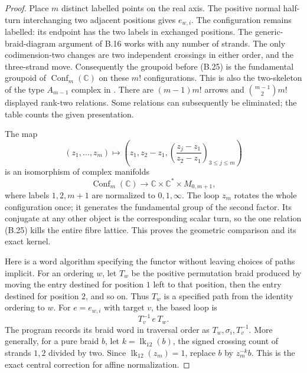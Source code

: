 \begin{proof}
Place $m$ distinct labelled points on the real axis.  The positive
normal half-turn interchanging two adjacent positions gives
$e_{w,i}$.  The configuration remains labelled: its endpoint has
the two labels in exchanged positions.  The generic-braid-diagram
argument of B.16 works with any number of strands.  The only
codimension-two changes are two independent crossings in either
order, and the three-strand move.  Consequently the groupoid
before (B.25) is the fundamental groupoid of
$\operatorname{Conf}_m(\mathbb C)$ on these $m!$ configurations.
This is also the two-skeleton of the type $A_{m-1}$ complex in
\citet[Section 4.1]{B_SalvettiSettepanella}.  There are
$(m-1)m!$ arrows and $\binom{m-1}{2}m!$ displayed rank-two
relations.  Some relations can subsequently be eliminated; the
table counts the given presentation.

The map
\[
 (z_1,\ldots,z_m)\longmapsto
 \left(z_1,z_2-z_1,
  \left(\frac{z_j-z_1}{z_2-z_1}\right)_{3\leq j\leq m}\right)
                                                               \tag{B.28}
\]
is an isomorphism of complex manifolds
\[
 \operatorname{Conf}_m(\mathbb C)
 \longrightarrow\mathbb C\times\mathbb C^*\times M_{0,m+1},
\]
where labels $1,2,m+1$ are normalized to $0,1,\infty$.
The loop $z_m$ rotates the whole configuration once; it generates
the fundamental group of the second factor.  Its conjugate at
any other object is the corresponding scalar turn, so the one
relation (B.25) kills the entire fibre lattice.  This proves the
geometric comparison and its exact kernel.

Here is a word algorithm specifying the functor without leaving
choices of paths implicit.  For an ordering $w$, let $T_w$ be the
positive permutation braid produced by moving the entry destined
for position $1$ left to that position, then the entry destined
for position $2$, and so on.  Thus $T_w$ is a specified path from
the identity ordering to $w$.  For $e=e_{w,i}$ with target $v$,
the based loop is
\[
 T_v^{-1}\,e\,T_w.                                  \tag{B.29}
\]
The program records its braid word in traversal order as
$T_w,\sigma_i,T_v^{-1}$.  More generally, for a pure braid $b$,
let $k=\operatorname{lk}_{12}(b)$, the signed crossing count of
strands $1,2$ divided by two.  Since
$\operatorname{lk}_{12}(z_m)=1$, replace $b$ by $z_m^{-k}b$.
This is the exact central correction for affine normalization.


\end{proof}
